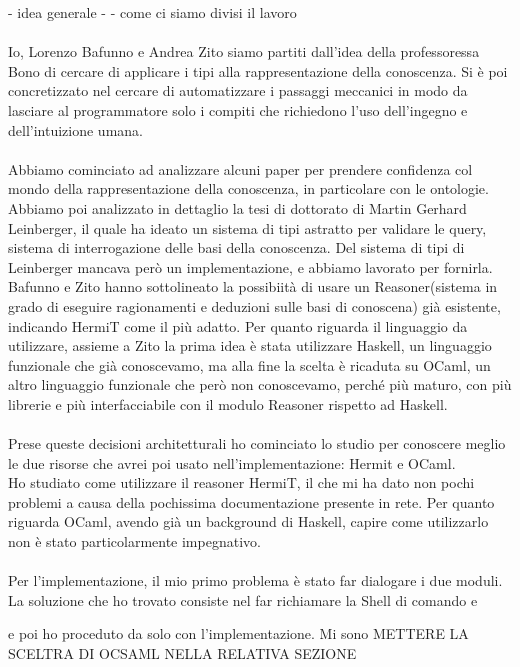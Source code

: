 - idea generale
- 
- come ci siamo divisi il lavoro

\paragraph{} Io, Lorenzo Bafunno e Andrea Zito siamo partiti dall'idea della professoressa Bono di cercare di applicare i tipi alla rappresentazione della conoscenza. Si è poi concretizzato nel cercare di automatizzare i passaggi meccanici in modo da lasciare al programmatore solo i compiti che richiedono l'uso dell'ingegno e dell'intuizione umana.

\paragraph{} Abbiamo cominciato ad analizzare alcuni paper per prendere confidenza col mondo della rappresentazione della conoscenza, in particolare con le ontologie. Abbiamo poi analizzato in dettaglio la tesi di dottorato di Martin Gerhard Leinberger, il quale ha ideato un sistema di tipi astratto per validare le query, sistema di interrogazione delle basi della conoscenza. Del sistema di tipi di Leinberger mancava però un implementazione, e abbiamo lavorato per fornirla. Bafunno e Zito hanno sottolineato la possibiità di usare un Reasoner(sistema in grado di eseguire ragionamenti e deduzioni sulle basi di conoscena) già esistente, indicando HermiT come il più adatto. Per quanto riguarda il linguaggio da utilizzare, assieme a Zito la prima idea è stata utilizzare Haskell, un linguaggio funzionale che già conoscevamo, ma alla fine la scelta è ricaduta su OCaml, un altro linguaggio funzionale che però non conoscevamo, perché più maturo, con più librerie e più interfacciabile con il modulo Reasoner rispetto ad Haskell.

\paragraph{} Prese queste decisioni architetturali ho cominciato lo studio per conoscere meglio le due risorse che avrei poi usato nell'implementazione: Hermit e OCaml.\\
Ho studiato come utilizzare il reasoner HermiT, il che mi ha dato non pochi problemi  a causa della pochissima documentazione presente in rete. Per quanto riguarda OCaml, avendo già un background di Haskell, capire come utilizzarlo non è stato particolarmente impegnativo.

\paragraph{} Per l'implementazione, il mio primo problema è stato far dialogare i due moduli. La soluzione che ho trovato consiste nel far richiamare la Shell di comando e  



e poi ho proceduto da solo con l'implementazione. Mi sono  METTERE LA SCELTRA DI OCSAML NELLA RELATIVA SEZIONE  
